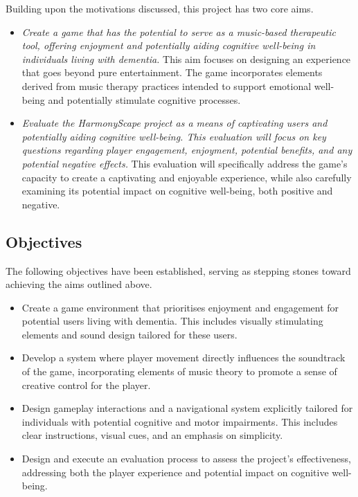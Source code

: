 \documentclass{l4proj}
\begin{document}
Building upon the motivations discussed, this project has two core aims.

\begin{itemize}
    \item \emph{Create a game that has the potential to serve as a music-based therapeutic tool, offering enjoyment and potentially aiding cognitive well-being in individuals living with dementia.} This aim focuses on designing an experience that goes beyond pure entertainment. The game incorporates elements derived from music therapy practices intended to support emotional well-being and potentially stimulate cognitive processes.
    \item \emph{Evaluate the HarmonyScape project as a means of captivating users and potentially aiding cognitive well-being. This evaluation will focus on key questions regarding player engagement, enjoyment, potential benefits, and any potential negative effects.} This evaluation will specifically address the game's capacity to create a captivating and enjoyable experience, while also carefully examining its potential impact on cognitive well-being, both positive and negative.
\end{itemize}

\subsection{Objectives}

The following objectives have been established, serving as stepping stones toward achieving the aims outlined above.

\begin{itemize}
    \item Create a game environment that prioritises enjoyment and engagement for potential users living with dementia. This includes visually stimulating elements and sound design tailored for these users.
    \item Develop a system where player movement directly influences the soundtrack of the game, incorporating elements of music theory to promote a sense of creative control for the player.
    \item Design gameplay interactions and a navigational system explicitly tailored for individuals with potential cognitive and motor impairments. This includes clear instructions, visual cues, and an emphasis on simplicity.
    \item Design and execute an evaluation process to assess the project's effectiveness, addressing both the player experience and potential impact on cognitive well-being.
\end{itemize}
\end{document}
